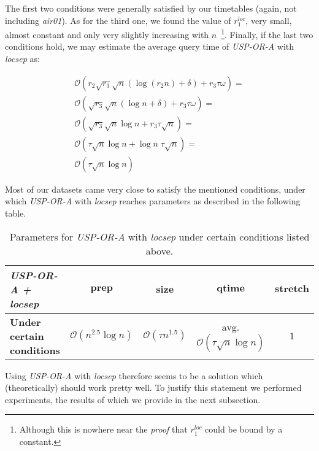 		\noindent The first two conditions were generally satisfied by our timetables (again, not including \textit{air01}). As for the third one, we found the value of $r_{1}^{loc}$, very small, almost constant and only very slightly increasing with $n$~\footnote{Although this is nowhere near the \textit{proof} that $r_{1}^{loc}$ could be bound by a constant.}. Finally, if the last two conditions hold, we may estimate the average query time of \textit{USP-OR-A} with \textit{locsep} as:
		
		\begin{align*}
			\mathcal{O}(r_{2} \sqrt{r_{3}} \sqrt{n} (\log (r_{2}n) + \delta) + r_{3} \tau \omega) = \\
			\mathcal{O}(\sqrt{r_{3}} \sqrt{n} (\log n + \delta) + r_{3} \tau \omega) = \\
			\mathcal{O}(\sqrt{r_{3}} \sqrt{n} \log n + r_{3} \tau \sqrt{n}) = \\
			\mathcal{O}(\tau \sqrt{n} \log n + \log n \; \tau \sqrt{n}) = \\
			\mathcal{O}(\tau \sqrt{n} \log n)
		\end{align*}
		
		\noindent Most of our datasets came very close to satisfy the mentioned conditions, under which \textit{USP-OR-A} with \textit{locsep} reaches parameters as described in the following table.
		
		\begin{table}[H]
			\centering
			\begin{tabular}{l|c|c|c|c}
				\cellcolor{oracle-clr} \textit{\textbf{USP-OR-A + locsep}} & \cellcolor{oracle-clr} $\bm{prep}$ & \cellcolor{oracle-clr} $\bm{size}$ & \cellcolor{oracle-clr} $\bm{qtime}$ & \cellcolor{oracle-clr} $\bm{stretch}$ \\
				\hline
				\cellcolor{oracle-clr} \textbf{Under certain conditions} & $\mathcal{O}(n^{2.5} \log n)$ & $\mathcal{O}(\tau n^{1.5})$ & avg. $\mathcal{O}(\tau \sqrt{n} \log n)$ & $1$ \\
			\end{tabular}
			\caption{\label{tab:usporalocsep} Parameters for \textit{USP-OR-A} with \textit{locsep} under certain conditions listed above.}
		\end{table}
		
		\noindent Using \textit{USP-OR-A} with \textit{locsep} therefore seems to be a solution which (theoretically) should work pretty well. To justify this statement we performed experiments, the results of which we provide in the next subsection.
	
